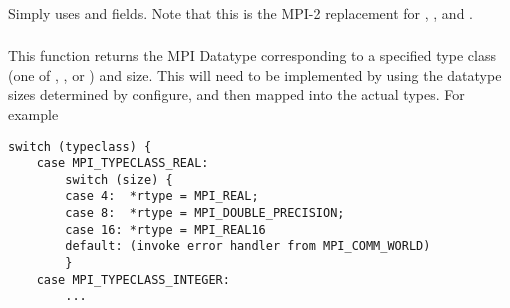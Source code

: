 \documentclass{article}
\begin{document}
\\
\\
\\
\\
\\
\\
\\
\\
\\
\\
\\
\\
\\
\\
\\
\\
\\
\\

\subsubsection{}
Simply uses  and 
fields.  Note that this is the MPI-2 replacement for
, , and .

\subsubsection{}
This function returns the MPI Datatype corresponding to a specified type class
(one of , , or
) and size.  This will need to be implemented
by using the datatype sizes determined by configure, and then mapped into 
the actual types.  For example
\begin{verbatim}
switch (typeclass) {
    case MPI_TYPECLASS_REAL:
        switch (size) {
        case 4:  *rtype = MPI_REAL;
        case 8:  *rtype = MPI_DOUBLE_PRECISION;
        case 16: *rtype = MPI_REAL16
        default: (invoke error handler from MPI_COMM_WORLD)
        }
    case MPI_TYPECLASS_INTEGER:
        ...
\end{verbatim}
\end{document}
